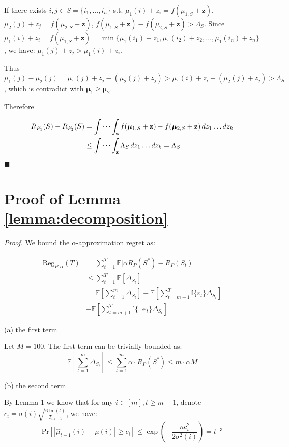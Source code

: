 \documentclass[opre,sglanonrev]{informs4}
\begin{document}
If there exists $i,j\in S=\{i_1,...,i_n\}$ s.t. $\mu_1(i)+z_i = f(\mu_{1,S}+\mathbf{z})$, $\mu_2(j)+z_j = f(\mu_{2,S}+\mathbf{z})$, $f(\mu_{1,S}+\mathbf{z})-f(\mu_{2,S}+\mathbf{z})>\Lambda_S$. Since $\mu_1(i)+z_i = f(\mu_{1,S}+\mathbf{z}) = \min \{\mu_1(i_1)+z_1,\mu_1(i_2)+z_2, \dots ,\mu_1(i_n)+z_n\}$, we have: $\mu_1(j)+z_j> \mu_1(i)+z_i$.

Thus $\mu_1(j)-\mu_2(j) = \mu_1(j)+z_j-(\mu_2(j)+z_j)>\mu_1(i)+z_i-(\mu_2(j)+z_j)>\Lambda_S$, which is contradict with $\boldsymbol{\mu}_1 \geq \boldsymbol{\mu}_2$.

Therefore

$$
\begin{aligned}
R_{P_1}(S)-R_{P_2}(S) &= \idotsint_\mathbf{z} f(\boldsymbol{\mu}_{1,S}+\mathbf{z})-f(\boldsymbol{\mu}_{2,S}+\mathbf{z}) \,dz_1 \dots dz_k\\
&\leq \idotsint_\mathbf{z} \Lambda_S \,dz_1 \dots dz_k = \Lambda_S 
\end{aligned}
$$
\hfill $\blacksquare$

\section{Proof of Lemma \ref{lemma:decomposition}}
\textit{Proof.} 
We bound the $\alpha$-approximation regret as:

\begin{equation}
	\begin{aligned}
		  \text{Reg}_{P,\alpha}(T) &= \sum_{t=1}^{T}\mathbb{E}\big[\alpha R_P(S^*) - R_P(S_t)\big]\\
		  &\leq \sum_{t=1}^{T}\mathbb{E}[\Delta_{S_t}]\\
		  &=\mathbb{E}[\sum_{t=1}^{m}\Delta_{S_t}]+\mathbb{E}[\sum_{t=m+1}^{T}\mathbb{I}\{\varepsilon_t\}\Delta_{S_t}]\\
		  &+\mathbb{E}[\sum_{t=m+1}^{T}\mathbb{I}\{\lnot \varepsilon_t\}\Delta_{S_t}]
	\end{aligned}
\end{equation}

(a) the first term 

Let $M  = 100$, The first term can be trivially bounded as:
\begin{equation}
	\mathbb{E}[\sum_{t=1}^{m}\Delta_{S_t}] \leq \sum_{t=1}^{m}\alpha \cdot R_P(S^*) \leq m \cdot \alpha M
\end{equation}

(b) the second term 

By Lemma 1 we know that for any $i \in [m],t\geq m+1$, denote $c_i = \sigma(i)\sqrt{\frac{6\ln(t)}{T_{i,t-1}}}$, we have:
$$
	\text{Pr}[|\hat{\mu}_{t-1}(i)-\mu(i)|\geq c_i] \leq \exp(-\frac{nc_i^2}{2\sigma^2(i)}) = t^{-3}
$$
\end{document}
